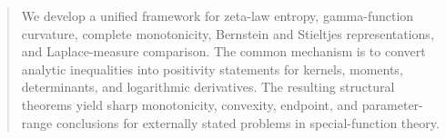 \begin{abstract}
We develop a unified framework for zeta-law entropy, gamma-function curvature, complete monotonicity, Bernstein and Stieltjes representations, and Laplace-measure comparison.  The common mechanism is to convert analytic inequalities into positivity statements for kernels, moments, determinants, and logarithmic derivatives.  The resulting structural theorems yield sharp monotonicity, convexity, endpoint, and parameter-range conclusions for externally stated problems in special-function theory.
\end{abstract}
